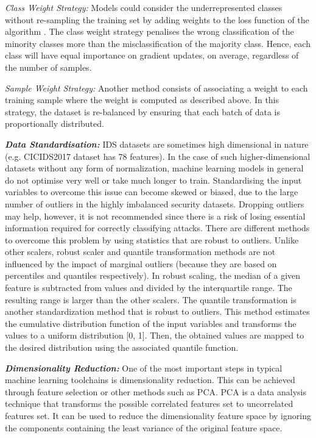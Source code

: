 \documentclass[runningheads]{llncs}
\begin{document}
\textit{Class Weight Strategy:}
Models could consider the underrepresented classes without re-sampling the training set by adding weights to the loss function of the algorithm \cite{ClassWeight}. The class weight strategy penalises the wrong classification of the minority classes more than the misclassification of the majority class. Hence, each class will have equal importance on gradient updates, on average, regardless of the number of samples. 

\textit{Sample Weight Strategy:}
Another method consists of associating a weight to each training sample where the weight is computed as described above. In this strategy, the dataset is re-balanced by ensuring that each batch of data is proportionally distributed.

\textbf{\textit{Data Standardisation:}}
\ac{IDS} datasets are sometimes high dimensional in nature (e.g. CICIDS2017 dataset has 78 features). In the case of such higher-dimensional datasets without any form of normalization, machine learning models in general do not optimise very well or take much longer to train. Standardising the input variables to overcome this issue can become skewed or biased, due to the large number of outliers in the highly imbalanced security datasets. Dropping outliers may help, however, it is not recommended since there is a risk of losing essential information required for correctly classifying attacks. There are different methods to overcome this problem by using statistics that are robust to outliers. Unlike other scalers, robust scaler and quantile transformation methods are not influenced by the impact of marginal outliers (because they are based on percentiles and quantiles respectively). In robust scaling, the median of a given feature is subtracted from values and divided by the interquartile range. The resulting range is larger than the other scalers. The quantile transformation is another standardization method that is robust to outliers. This method estimates the cumulative distribution function of the input variables and transforms the values to a uniform distribution [0, 1]. Then, the obtained values are mapped to the desired distribution using the associated quantile function.

\textbf{\textit{Dimensionality Reduction:}}
One of the most important steps in typical machine learning toolchains is dimensionality reduction. This can be achieved through feature selection or other methods such as \ac{PCA}. \ac{PCA} is a data analysis technique that transforms the possible correlated features set to uncorrelated features set. 
It can be used to reduce the dimensionality feature space by ignoring the components containing the least variance of the original feature space. 
\end{document}
